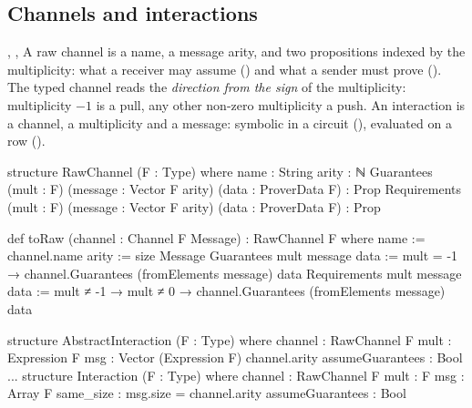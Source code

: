 \subsection{Channels and interactions}\label{sec:gen-lib-clean-channels}

\begin{define}{, , }
A raw channel is a name, a message arity, and two propositions indexed by the multiplicity: what
a receiver may assume () and what a sender must prove (). The
typed channel reads the \emph{direction from the sign} of the multiplicity: multiplicity $-1$ is a
pull, any other non-zero multiplicity a push. An interaction is a channel, a multiplicity and a
message: symbolic in a circuit (), evaluated on a row
().
\end{define}

\begin{leancode}
structure RawChannel (F : Type) where
  name : String
  arity : ℕ
  Guarantees (mult : F) (message : Vector F arity) (data : ProverData F) : Prop
  Requirements (mult : F) (message : Vector F arity) (data : ProverData F) : Prop
\end{leancode}



\begin{leancode}
def toRaw (channel : Channel F Message) : RawChannel F where
  name := channel.name
  arity := size Message
  Guarantees mult message data :=
    mult = -1 → channel.Guarantees (fromElements message) data
  Requirements mult message data :=
    mult ≠ -1 →
    mult ≠ 0 →
    channel.Guarantees (fromElements message) data
\end{leancode}



\begin{leancode}
structure AbstractInteraction (F : Type) where
  channel : RawChannel F
  mult : Expression F
  msg : Vector (Expression F) channel.arity
  assumeGuarantees : Bool
...
structure Interaction (F : Type) where
  channel : RawChannel F
  mult : F
  msg : Array F
  same_size : msg.size = channel.arity
  assumeGuarantees : Bool
\end{leancode}


